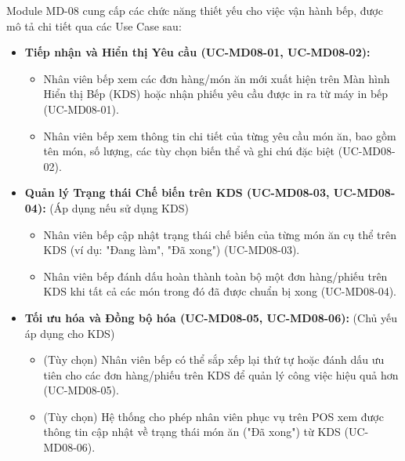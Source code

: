 \label{sssec:md08_key_functionalities}
Module MD-08 cung cấp các chức năng thiết yếu cho việc vận hành bếp, được mô tả chi tiết qua các Use Case sau:

\begin{itemize}
    \item \textbf{Tiếp nhận và Hiển thị Yêu cầu (UC-MD08-01, UC-MD08-02):}
    \begin{itemize}
        \item Nhân viên bếp xem các đơn hàng/món ăn mới xuất hiện trên Màn hình Hiển thị Bếp (KDS) hoặc nhận phiếu yêu cầu được in ra từ máy in bếp (UC-MD08-01).
        \item Nhân viên bếp xem thông tin chi tiết của từng yêu cầu món ăn, bao gồm tên món, số lượng, các tùy chọn biến thể và ghi chú đặc biệt (UC-MD08-02).
    \end{itemize}

    \item \textbf{Quản lý Trạng thái Chế biến trên KDS (UC-MD08-03, UC-MD08-04):} (Áp dụng nếu sử dụng KDS)
    \begin{itemize}
        \item Nhân viên bếp cập nhật trạng thái chế biến của từng món ăn cụ thể trên KDS (ví dụ: "Đang làm", "Đã xong") (UC-MD08-03).
        \item Nhân viên bếp đánh dấu hoàn thành toàn bộ một đơn hàng/phiếu trên KDS khi tất cả các món trong đó đã được chuẩn bị xong (UC-MD08-04).
    \end{itemize}

    \item \textbf{Tối ưu hóa và Đồng bộ hóa (UC-MD08-05, UC-MD08-06):} (Chủ yếu áp dụng cho KDS)
    \begin{itemize}
        \item (Tùy chọn) Nhân viên bếp có thể sắp xếp lại thứ tự hoặc đánh dấu ưu tiên cho các đơn hàng/phiếu trên KDS để quản lý công việc hiệu quả hơn (UC-MD08-05).
        \item (Tùy chọn) Hệ thống cho phép nhân viên phục vụ trên POS xem được thông tin cập nhật về trạng thái món ăn ("Đã xong") từ KDS (UC-MD08-06).
    \end{itemize}
\end{itemize}

